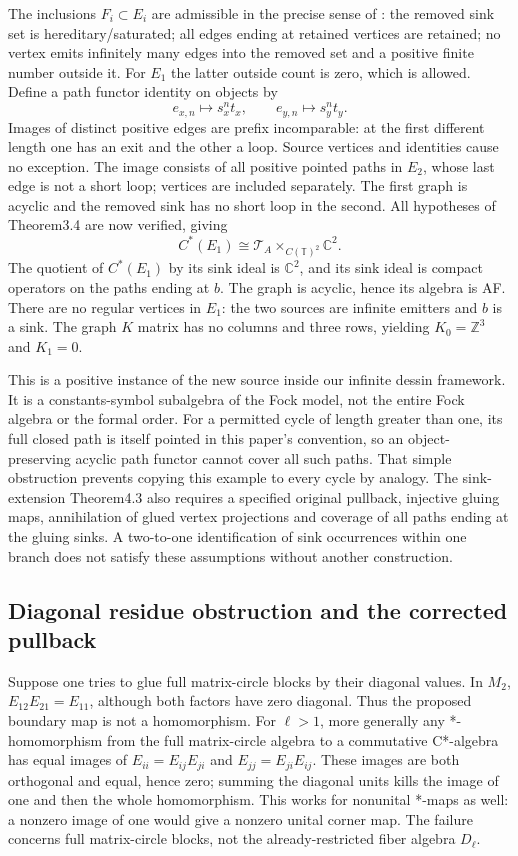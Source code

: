 \documentclass[11pt]{article}
\theoremstyle{definition}\newtheorem{definition}[theorem]{Definition}
\theoremstyle{remark}\newtheorem{remark}[theorem]{Remark}
\newcommand{\C}{\mathbb C}\newcommand{\Z}{\mathbb Z}\newcommand{\R}{\mathbb R}
\begin{document}
The inclusions $F_i\subset E_i$ are admissible in the precise sense of \cite[Definition3.1]{GraphPullbacks}: the removed sink set is hereditary/saturated; all edges ending at retained vertices are retained; no vertex emits infinitely many edges into the removed set and a positive finite number outside it. For $E_1$ the latter outside count is zero, which is allowed. Define a path functor identity on objects by
\[
 e_{x,n}\longmapsto s_x^nt_x,\qquad
 e_{y,n}\longmapsto s_y^nt_y.
\]
Images of distinct positive edges are prefix incomparable: at the first different length one has an exit and the other a loop. Source vertices and identities cause no exception. The image consists of all positive pointed paths in $E_2$, whose last edge is not a short loop; vertices are included separately. The first graph is acyclic and the removed sink has no short loop in the second. All hypotheses of Theorem3.4 are now verified, giving
\[
 C^*(E_1)\cong\mathcal T_A\mathop{\times}_{C(\mathbb T)^2}\C^2.
\]
The quotient of $C^*(E_1)$ by its sink ideal is $\C^2$, and its sink ideal is compact operators on the paths ending at $b$. The graph is acyclic, hence its algebra is AF. There are no regular vertices in $E_1$: the two sources are infinite emitters and $b$ is a sink. The graph $K$ matrix has no columns and three rows, yielding $K_0=\Z^3$ and $K_1=0$.

This is a positive instance of the new source inside our infinite dessin framework. It is a constants-symbol subalgebra of the Fock model, not the entire Fock algebra or the formal order. For a permitted cycle of length greater than one, its full closed path is itself pointed in this paper's convention, so an object-preserving acyclic path functor cannot cover all such paths. That simple obstruction prevents copying this example to every cycle by analogy. The sink-extension Theorem4.3 also requires a specified original pullback, injective gluing maps, annihilation of glued vertex projections and coverage of all paths ending at the gluing sinks. A two-to-one identification of sink occurrences within one branch does not satisfy these assumptions without another construction.

\subsection{Diagonal residue obstruction and the corrected pullback}
Suppose one tries to glue full matrix-circle blocks by their diagonal values. In $M_2$, $E_{12}E_{21}=E_{11}$, although both factors have zero diagonal. Thus the proposed boundary map is not a homomorphism. For $\ell>1$, more generally any *-homomorphism from the full matrix-circle algebra to a commutative C*-algebra has equal images of $E_{ii}=E_{ij}E_{ji}$ and $E_{jj}=E_{ji}E_{ij}$. These images are both orthogonal and equal, hence zero; summing the diagonal units kills the image of one and then the whole homomorphism. This works for nonunital *-maps as well: a nonzero image of one would give a nonzero unital corner map. The failure concerns full matrix-circle blocks, not the already-restricted fiber algebra $D_\ell$.
\end{document}
